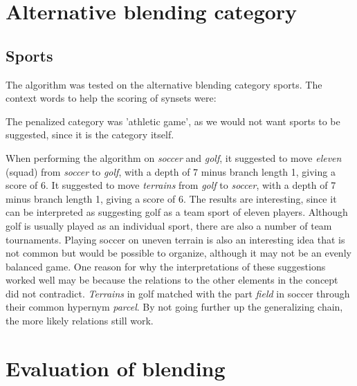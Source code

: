 
\section{Alternative blending category}
\subsection{Sports}
The algorithm was tested on the alternative blending category sports. The context words to help the scoring of synsets were:

\noindent{}
The penalized category was 'athletic game', as we would not want sports to be suggested, since it is the category itself.

When performing the algorithm on \emph{soccer} and \emph{golf}, it suggested to move \emph{eleven} (squad) from \emph{soccer} to \emph{golf}, with a depth of 7 minus branch length 1, giving a score of 6. It suggested to move \emph{terrains} from \emph{golf} to \emph{soccer}, with a depth of 7 minus branch length 1, giving a score of 6. The results are interesting, since it can be interpreted as suggesting golf as a team sport of eleven players. Although golf is usually played as an individual sport, there are also a number of team tournaments. Playing soccer on uneven terrain is also an interesting idea that is not common but would be possible to organize, although it may not be an evenly balanced game. One reason for why the interpretations of these suggestions worked well may be because the relations to the other elements in the concept did not contradict. \emph{Terrains} in golf matched with the part \emph{field} in soccer through their common hypernym \emph{parcel}. By not going further up the generalizing chain, the more likely relations still work.


\section{Evaluation of blending}

